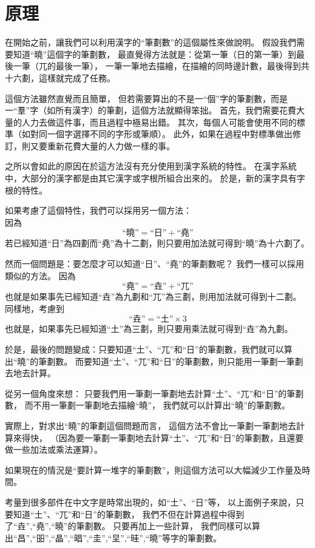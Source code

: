 \documentclass{article}
\newcommand\qhchar[1]{\mbox{#1}}
\begin{document}
\section{原理}
在開始之前，讓我們可以利用漢字的``筆劃數''的這個屬性來做說明。%
假設我們需要知道``曉''這個字的筆劃數，%
最直覺得方法就是：從第一筆（日的第一筆）到最後一筆（兀的最後一筆），%
一筆一筆地去描繪，在描繪的同時邊計數，最後得到共十六劃，這樣就完成了任務。%

這個方法雖然直覺而且簡單，%
但若需要算出的不是一``個''字的筆劃數，而是一``羣''字（如所有漢字）的筆劃，這個方法就顯得笨拙。
首先，我們需要花費大量的人力去做這件事，而且過程中極易出錯。
其次，每個人可能會使用不同的標準（如對同一個字選擇不同的字形或筆順）。
此外，如果在過程中對標準做出修訂，則又要重新花費大量的人力做一樣的事。

之所以會如此的原因在於這方法沒有充分使用到漢字系統的特性。
在漢字系統中，大部分的漢字都是由其它漢字或字根所組合出來的。
於是，新的漢字具有字根的特性。

如果考慮了這個特性，我們可以採用另一個方法：\\
因為\\
\[
  \qhchar{``曉''}=\qhchar{``日''}+\qhchar{``堯''}
\]
若已經知道``日''為四劃而``堯''為十二劃，則只要用加法就可得到``曉''為十六劃了。%

然而一個問題是：要怎麼才可以知道``日''、``堯''的筆劃數呢？%
我們一樣可以採用類似的方法。
因為\\
\[
  \qhchar{``堯''}=\qhchar{``垚''}+\qhchar{``兀''}
\]
也就是如果事先已經知道``垚''為九劃和``兀''為三劃，則用加法就可得到十二劃。
同樣地，考慮到\\
\[
  \qhchar{``垚''}=\qhchar{``土''}\times 3
\]
也就是，如果事先已經知道``土''為三劃，則只要用乘法就可得到``垚''為九劃。

於是，最後的問題變成：只要知道``土''、``兀''和``日''的筆劃數，我們就可以算出``曉''的筆劃數。
而要知道``土''、``兀''和``日''的筆劃數，則只能用一筆劃一筆劃去地去計算。

從另一個角度來想：
只要我們用一筆劃一筆劃地去計算``土''、``兀''和``日''的筆劃數，
而不用一筆劃一筆劃地去描繪``曉''，
我們就可以計算出``曉''的筆劃數。

實際上，對求出``曉''的筆劃這個問題而言，
這個方法不會比一筆劃一筆劃地去計算來得快，
（因為要一筆劃一筆劃地去計算``土''、``兀''和``日''的筆劃數，且還要做一些加法或乘法運算）。

如果現在的情況是``要計算一堆字的筆劃數''，則這個方法可以大幅減少工作量及時間。

考量到很多部件在中文字是時常出現的，如``土''、``日''等，
以上面例子來說，只要知道``土''、``兀''和``日''的筆劃數，
我們不但在計算過程中得到了``垚'',``堯'',``曉''的筆劃數。
只要再加上一些計算，
我們同樣可以算出``昌'',``昍'',``晶'',``晿'',``圭'',``圼'',``晆'',``曉''等字的筆劃數。
\end{document}
